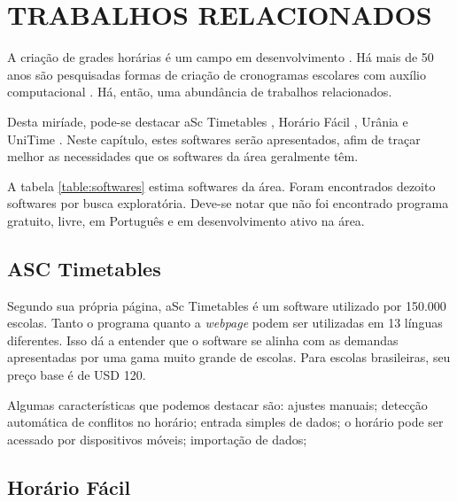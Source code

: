 \documentclass[12pt,a4paper]{article}
\begin{document}
	\section{TRABALHOS RELACIONADOS}

		\par A criação de grades horárias é um campo em desenvolvimento \cite{patat2020}. Há mais de 50 anos são pesquisadas formas de criação de cronogramas escolares com auxílio computacional \cite{appleby}. Há, então, uma abundância de trabalhos relacionados.

		\par Desta miríade, pode-se destacar aSc Timetables \cite{rel_asctimetables}, Horário Fácil \cite{rel_horariofacil}, Urânia \cite{rel_urania} e UniTime \cite{rel_unitime}. Neste capítulo, estes softwares serão apresentados, afim de traçar melhor as necessidades que os softwares da área geralmente têm.

		\par A tabela \ref{table:softwares} estima softwares da área. Foram encontrados dezoito softwares por busca exploratória. Deve-se notar que não foi encontrado programa gratuito, livre, em Português e em desenvolvimento ativo na área.

		\subsection{ASC Timetables}

			\par Segundo sua própria página, aSc Timetables é um software utilizado por 150.000 escolas. Tanto o programa quanto a \textit{webpage} podem ser utilizadas em 13 línguas diferentes. Isso dá a entender que o software se alinha com as demandas apresentadas por uma gama muito grande de escolas. Para escolas brasileiras, seu preço base é de USD 120.

			\par Algumas características que podemos destacar são: ajustes manuais; detecção automática de conflitos no horário; entrada simples de dados;  o horário pode ser acessado por dispositivos móveis; importação de dados;

		\subsection{Horário Fácil}
\end{document}
